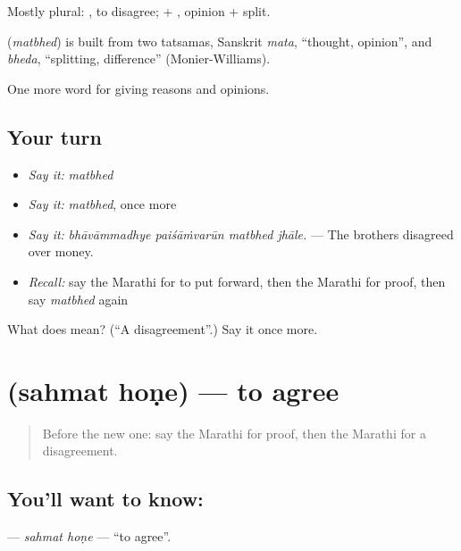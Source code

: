 Mostly plural:  , to disagree;  + , opinion + split.

\begin{cousinweb}
\textbf{} (\emph{matbhed}) is built from two tatsamas, Sanskrit \emph{mata}, \textquotedblleft{}thought, opinion\textquotedblright{}, and \emph{bheda}, \textquotedblleft{}splitting, difference\textquotedblright{} (Monier-Williams).
\end{cousinweb}

\begin{grammarlens}[title={What you've built}]
One more word for giving reasons and opinions.
\end{grammarlens}

\subsection*{Your turn}
\begin{itemize}
\raggedright
  \item \emph{Say it:} \emph{matbhed}
  \item \emph{Say it:} \emph{matbhed}, once more
  \item \emph{Say it:} \emph{bhāvāmmadhye paiśāṁvarūn matbhed jhāle.} — The brothers disagreed over money.
  \item \emph{Recall:} say the Marathi for to put forward, then the Marathi for proof, then say \emph{matbhed} again
\end{itemize}

\begin{tcolorbox}[breakable,colback=teal!4,colframe=teal!35!black,title={Before you move on}]
What does  mean? (\textquotedblleft{}A disagreement\textquotedblright{}.) Say it once more.
\end{tcolorbox}
\section[\texorpdfstring{\mr{सहमत} \mr{होणे} (sahmat hoṇe)}{सहमत होणे (sahmat hoṇe)}]{  (sahmat hoṇe) — to agree}

\label{lesson:MR-C344-sahmat-hone}



\begin{quote}
Before the new one: say the Marathi for proof, then the Marathi for a disagreement.
\end{quote}

\subsection*{You'll want to know:  }
\textbf{ } — \emph{sahmat hoṇe} — \textquotedblleft{}to agree\textquotedblright{}.

